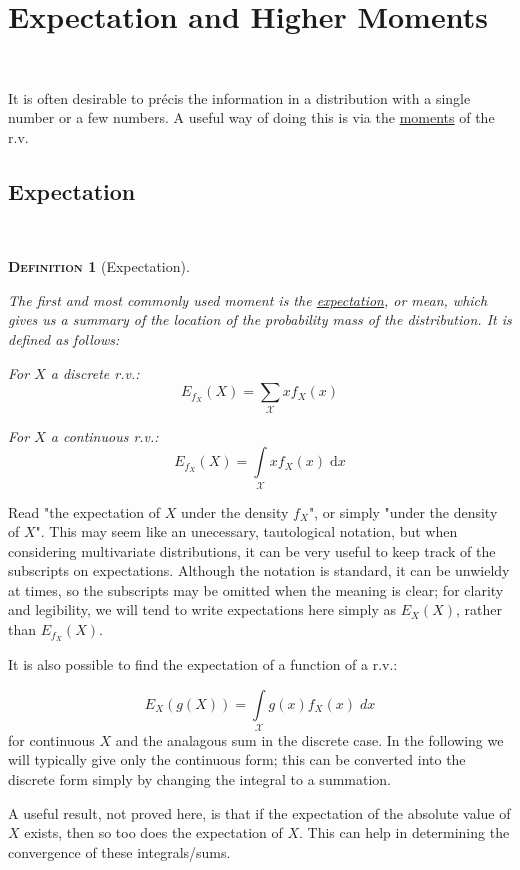 \documentclass[12pt,a4paper]{article}
\newtheorem{definition}{\textsc{Definition}}[section]
\begin{document}
\clearpage
\section{Expectation and Higher Moments}$\;$

It is often desirable to pr\'ecis the information in a distribution with a single number or a few numbers. A useful way of doing this is via the \underline{moments} of the r.v.

\subsection{Expectation}$\;$

\begin{definition}[Expectation]$\;$\par
\vspace{1cm}

The first and most commonly used moment is the \underline{expectation}, or mean, which gives us a summary of the location of the probability mass of the distribution. It is defined as follows:\par
\vspace{1cm}
\noindent For $X$ a discrete r.v.:
$$E_{f_X}(X) = \sum_{\mathcal{X}}x f_X(x)$$

\noindent For $X$ a continuous r.v.:
$$E_{f_X}(X) = \int\limits_{\mathcal{X}} x f_X(x)\; \mathrm{d}x$$

\end{definition}

Read "the expectation of $X$ under the density $f_X$", or simply "under the density of $X$". This may seem like an unecessary, tautological notation, but when considering multivariate distributions, it can be very useful to keep track of the subscripts on expectations. Although the notation is standard, it can be unwieldy at times, so the subscripts may be omitted when the meaning is clear; for clarity and legibility, we will tend to write expectations here simply as $E_X(X)$, rather than $E_{f_X}(X)$.

It is also possible to find the expectation of a function of a r.v.:

$$E_{X}(g(X)) = \int\limits_{\mathcal{X}} \!\!g(x) f_X(x)\; dx$$
for continuous $X$ and the analagous sum in the discrete case. In the following we will typically give only the continuous form; this can be converted into the discrete form simply by changing the integral to a summation.

A useful result, not proved here, is that if the expectation of the absolute value of $X$ exists, then so too does the expectation of $X$. This can help in determining the convergence of these integrals/sums.
\end{document}
